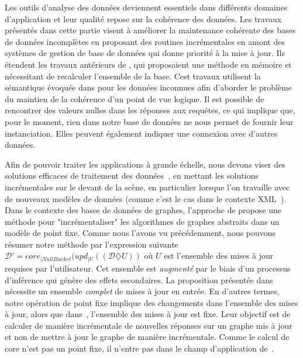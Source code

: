 Les outils d'analyse des données deviennent essentiels dans différents domaines d'application et leur qualité repose sur la cohérence des données.
Les travaux présentés dans cette partie visent à améliorer la maintenance cohérente des bases de données incomplètes en proposant des routines incrémentales en amont des systèmes de gestion de base de données qui donne priorité à la mise à jour.
Ils étendent les travaux antérieurs de \cite{chabinConsistentUpdatingDatabases2020}, qui proposaient une méthode en mémoire et nécessitant de recalculer l'ensemble de la base.
Cest travaux utilisent la sémantique évoquée dans \cite{reiterSoundSometimesComplete1986} pour les données inconnues afin d'aborder le problème du maintien de la cohérence d'un point de vue logique.
Il est possible de rencontrer des valeurs nulles dans les réponses aux requêtes, ce qui implique que, pour le moment, rien dans notre base de données ne nous permet de fournir leur instanciation.
Elles peuvent également indiquer une connexion avec d'autres données.

Afin de pouvoir traiter les applications à grande échelle, nous devons viser des solutions efficaces de traitement des données~\cite{sirangeloRepresentingQueryingIncomplete2014}, en mettant les solutions incrémentales sur le devant de la scène, en particulier lorsque l'on travaille avec de nouveaux modèles de données (comme c'est le cas dans le contexte XML~\cite{bouchouUpdatesIncrementalValidation2003,abraoIncrementalConstraintChecking2004,balminIncrementalValidationXML2004}).
Dans le contexte des bases de données de graphes, l'approche de \cite{fanIncrementalizingGraphAlgorithms2021} propose une méthode pour "incrémentaliser" les algorithmes de graphes abstraits dans un modèle de point fixe.
Comme nous l'avons vu précédemment, nous pouvons résumer notre méthode par l'expression suivante
$\mathcal{D}' = core_{|NullBucket}(upd_{|U}((\mathcal{D}\diamondsuit U))$ où $U$ est l'ensemble des mises à jour requises par l'utilisateur.
Cet ensemble est \emph{augmenté} par le biais d'un processus d'inférence qui génère des effets secondaires.
La proposition présentée dans~\cite{fanIncrementalizingGraphAlgorithms2021} nécessite un ensemble \emph{complet} de mises à jour en entrée.
En d'autres termes, notre opération de point fixe implique des changements dans l'ensemble des mises à jour, alors que dans~\cite{fanIncrementalizingGraphAlgorithms2021}, l'ensemble des mises à jour est fixe.
Leur objectif est de calculer de manière incrémentale de nouvelles réponses sur un graphe mis à jour et non de mettre à jour le graphe de manière incrémentale.
Comme le calcul de \gls{core} n'est pas un point fixe, il n'entre pas dans le champ d'application de~\cite{fanIncrementalizingGraphAlgorithms2021}.

